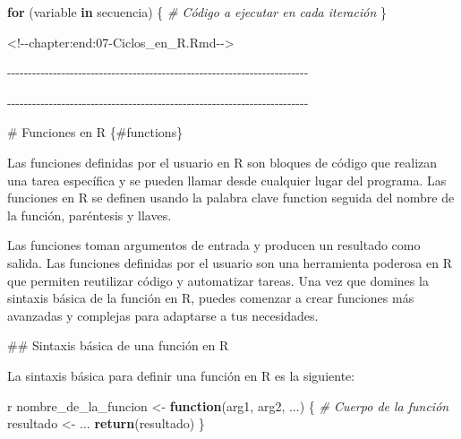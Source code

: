 \documentclass[
]{book}
\newenvironment{Shaded}{\begin{snugshade}}{\end{snugshade}}
\newcommand{\AttributeTok}[1]{\textcolor[rgb]{0.13,0.29,0.53}{#1}}
\newcommand{\CommentTok}[1]{\textcolor[rgb]{0.56,0.35,0.01}{\textit{#1}}}
\newcommand{\ControlFlowTok}[1]{\textcolor[rgb]{0.13,0.29,0.53}{\textbf{#1}}}
\newcommand{\FunctionTok}[1]{\textcolor[rgb]{0.13,0.29,0.53}{\textbf{#1}}}
\newcommand{\NormalTok}[1]{#1}
\newcommand{\OtherTok}[1]{\textcolor[rgb]{0.56,0.35,0.01}{#1}}
\newcommand{\StringTok}[1]{\textcolor[rgb]{0.31,0.60,0.02}{#1}}
\begin{document}
\begin{Shaded}
\begin{Highlighting}[]
\ControlFlowTok{for}\NormalTok{ (variable }\ControlFlowTok{in}\NormalTok{ secuencia) \{}
  \CommentTok{\# Código a ejecutar en cada iteración}
\NormalTok{\}}\StringTok{\textasciigrave{}\textasciigrave{}\textasciigrave{}}


\AttributeTok{\textless{}!{-}{-}chapter:end:07{-}Ciclos\_en\_R.Rmd{-}{-}\textgreater{}}

\AttributeTok{{-}{-}{-}{-}{-}{-}{-}{-}{-}{-}{-}{-}{-}{-}{-}{-}{-}{-}{-}{-}{-}{-}{-}{-}{-}{-}{-}{-}{-}{-}{-}{-}{-}{-}{-}{-}{-}{-}{-}{-}{-}{-}{-}{-}{-}{-}{-}{-}{-}{-}{-}{-}{-}{-}{-}{-}{-}{-}{-}{-}{-}{-}{-}{-}{-}{-}{-}{-}{-}{-}{-}{-}}

\AttributeTok{{-}{-}{-}{-}{-}{-}{-}{-}{-}{-}{-}{-}{-}{-}{-}{-}{-}{-}{-}{-}{-}{-}{-}{-}{-}{-}{-}{-}{-}{-}{-}{-}{-}{-}{-}{-}{-}{-}{-}{-}{-}{-}{-}{-}{-}{-}{-}{-}{-}{-}{-}{-}{-}{-}{-}{-}{-}{-}{-}{-}{-}{-}{-}{-}{-}{-}{-}{-}{-}{-}{-}{-}}

\AttributeTok{\# Funciones en R \{\#functions\}}

\AttributeTok{Las funciones definidas por el usuario en R son bloques de código que realizan una tarea específica y se pueden llamar desde cualquier lugar del programa. Las funciones en R se definen usando la palabra clave function seguida del nombre de la función, paréntesis y llaves.}

\AttributeTok{Las funciones toman argumentos de entrada y producen un resultado como salida. Las funciones definidas por el usuario son una herramienta poderosa en R que permiten reutilizar código y automatizar tareas. Una vez que domines la sintaxis básica de la función en R, puedes comenzar a crear funciones más avanzadas y complejas para adaptarse a tus necesidades.}

\AttributeTok{\#\# Sintaxis básica de una función en R}

\AttributeTok{La sintaxis básica para definir una función en R es la siguiente:}


\StringTok{\textasciigrave{}\textasciigrave{}\textasciigrave{}}\NormalTok{ r}
\NormalTok{nombre\_de\_la\_funcion }\OtherTok{\textless{}{-}} \ControlFlowTok{function}\NormalTok{(arg1, arg2, ...) \{}
  \CommentTok{\# Cuerpo de la función}
\NormalTok{  resultado }\OtherTok{\textless{}{-}}\NormalTok{ ...}
  \FunctionTok{return}\NormalTok{(resultado)}
\NormalTok{\}}
\end{Highlighting}
\end{Shaded}
\end{document}
